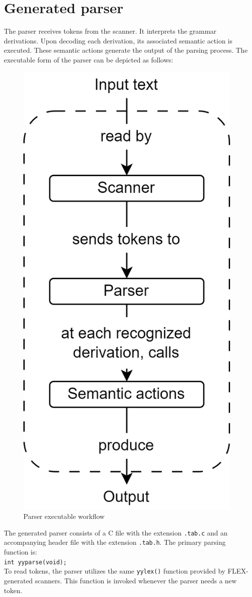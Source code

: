 \section{Generated parser}

The parser receives tokens from the scanner.
It interprets the grammar derivations.
Upon decoding each derivation, its associated semantic action is executed.
These semantic actions generate the output of the parsing process.
The executable form of the parser can be depicted as follows:
\begin{figure}[H]
    \centering
    \includegraphics[width=0.2\linewidth]{images/parser.png}
    \caption{Parser executable workflow}
\end{figure}
The generated parser consists of a C file with the extension \texttt{.tab.c} and an accompanying header file with the extension \texttt{.tab.h}. 
The primary parsing function is: \\
\texttt{int yyparse(void);} \\ 
To read tokens, the parser utilizes the same \texttt{yylex()} function provided by FLEX-generated scanners. 
This function is invoked whenever the parser needs a new token.